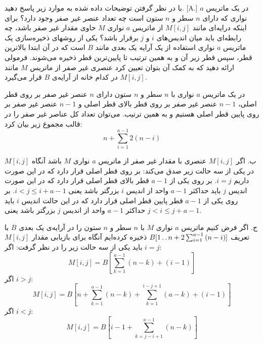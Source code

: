 با در نظر گرفتن توضیحات داده شده به موارد زیر پاسخ دهید.
[A.]
 در یک ماتریس {$a$} نواری که دارای {$n$} سطر و {$n$} ستون است چه تعداد عنصر غیر صفر وجود دارد؟
 برای اینکه درایه‌ای مانند {$M[i,j]$} از ماتریس {$a$} نواری {$M$} حاوی مقدار غیر صفر باشد، چه رابطه‌ای باید میان اندیس‌های {$i$} و {$j$} برقرار باشد؟ 
 یکی از روشهای ذخیره‌سازی یک ماتریس {$a$} نواری استفاده از یک آرایه یک بعدی مانند {$B$} است که در آن ابتدا بالاترین قطر، سپس قطر زیر آن و به همین ترتیب تا پایین‌ترین قطر ذخیره می‌شوند. فرمولی ارائه دهید که به کمک آن بتوان تعیین کرد عنصری غیر صفر از ماتریس {$M$} مانند {$M[i,j]$} در کدام خانه از آرایه‌ی {$B$} قرار می‌گیرد.


در یک ماتریس {$a$} نواری با {$n$} سطر و {$n$} ستون دارای {$n$} عنصر غیر صفر بر روی قطر اصلی، {$n-1$} عنصر غیر صفر بر روی قطر بالای قطر اصلی و {$n-1$} عنصر غیر صفر بر روی پایین قطر اصلی هستیم و به همین ترتیب. می‌توان تعداد کل عناصر غیر صفر را در قالب مجموع زیر بیان کرد:
\begin{displaymath}
n+\sum_{i=1}^{a-1}{2(n-i)}
\end{displaymath}

ب. اگر {$M[i,j]$} عنصری با مقدار غیر صفر از ماتریس {$a$} نواری {$M$} باشد آنگاه {$M[i,j]$} در یکی از سه حالت زیر صدق می‌کند:
 بر روی قطر اصلی قرار دارد که در این صورت داریم {$i=j$}.
 بر روی یکی از {$a-1$} قطر بالای قطر اصلی قرار دارد که در این صورت اندیس {$j$} باید حداکثر {$a-1$} واحد از اندیس {$i$} بزرگتر باشد یعنی {$i<j\leq i+a-1$}.
 بر روی یکی از {$a-1$} قطر پایین قطر اصلی قرار دارد که در این حالت اندیس {$i$} باید حداکثر {$a-1$} واحد از اندیس {$j$} بزرگتر باشد یعنی {$j<i\leq j+a-1$}.

ج. اگر فرض کنیم ماتریس {$a$} نواری {$M$} با {$n$} سطر و {$n$} ستون را در آرایه‌ی یک بعدی {$B$} با تعریف
 {$B[1\mathinner{\ldotp\ldotp} n+2\sum_{i=1}^{a-1}{(n-i)]}$} ذخیره کرده‌ایم آنگاه برای بازیابی مقدار {$M[i,j]$} باید یکی از سه حالت زیر را در نظر گرفت:
 اگر {$i=j$}:
\begin{displaymath}
M[i,j]=B[\sum_{k=1}^{a-1}{(n-k)}+(i-1)]
\end{displaymath}
 اگر {$i>j$}:
\begin{displaymath}
M[i,j]=B[n+\sum_{k=1}^{a-1}{(n-k)}+\sum_{k=1}^{i-j+1}{(a-k)}+(i-1)]
\end{displaymath}
 اگر {$i<j$}:
\begin{displaymath}
M[i,j]=B[i-1+\sum_{k=j-i+1}^{a-1}{(n-k)}]
\end{displaymath}
